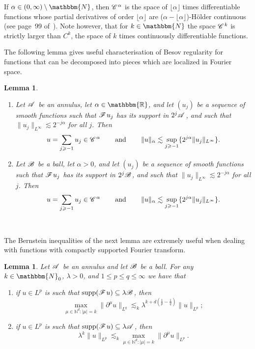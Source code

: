 \documentclass[11pt,reqno]{amsart}
\newcommand{\tmdummy}{$\mbox{}$}
\newcommand{\tmop}[1]{\ensuremath{\operatorname{#1}}}
\newenvironment{enumeratenumeric}{\begin{enumerate}[1.] }{\end{enumerate}}
\newtheorem{lemma}[theorem]{Lemma}
\newcommand{\CC}{\mathscr{C} \hspace{.1em}}
\newcommand{\CF}{\mathscr{F} \hspace{.1em}}
\newcommand{\CB}{\mathscr{B} \hspace{.1em}}
\newcommand{\CA}{\mathscr{A} \hspace{.1em}}
\begin{document}
If $\alpha \in (0, \infty) \setminus \mathbbm{N}$, then $\CC^{\alpha}$ is the
space of $\lfloor \alpha \rfloor$ times differentiable functions whose partial
derivatives of order $\lfloor \alpha \rfloor$ are ($\alpha - \lfloor \alpha
\rfloor$)-H{\"o}lder continuous (see page~99
of~{\cite{bahouri_fourier_2011}}). Note however, that for $k \in \mathbbm{N}$
the space $\CC^k$ is strictly larger than $C^k$, the space of $k$ times
continuously differentiable functions.

The following lemma gives useful characterisation of Besov regularity for
functions that can be decomposed into pieces which are localized in Fourier
space.

\begin{lemma}
  \label{lem: Besov regularity of series}{\tmdummy}
  
  \begin{enumeratenumeric}
    \item Let $\CA$ be an annulus, let $\alpha \in \mathbb{\mathbbm{R}}$, and
    let $(u_j)$ be a sequence of smooth functions such that $\CF u_j$ has its
    support in $2^j \CA$, and such that $\|u_j \|_{L^{\infty}} \lesssim 2^{- j
    \alpha}$ for all $j$. Then
    \[ u = \sum_{j \geqslant - 1} u_j \in \CC^{\alpha} \qquad \tmop{and}
       \qquad \|u\|_{\alpha} \lesssim \sup_{j \geqslant - 1} \{2^{j \alpha}
       \|u_j \|_{L^{\infty}} \} . \]
    \item Let $\CB$ be a ball, let $\alpha > 0$, and let $(u_j)$ be a sequence
    of smooth functions such that $\CF u_j$ has its support in $2^j \CB$, and
    such that $\|u_j \|_{L^{\infty}} \lesssim 2^{- j \alpha}$ for all $j$.
    Then
    \[ u = \sum_{j \geqslant - 1} u_j \in \CC^{\alpha} \qquad \tmop{and}
       \qquad \|u\|_{\alpha} \lesssim \sup_{j \geqslant - 1} \{2^{j \alpha}
       \|u_j \|_{L^{\infty}} \} . \]
  \end{enumeratenumeric}
\end{lemma}

\

The Bernstein inequalities of the next lemma are extremely useful when
dealing with functions with compactly supported Fourier transform.

\begin{lemma}
  \label{lemma:Bernstein}Let $\CA$ be an annulus and let $\CB$ be a ball. For
  any $k \in \mathbbm{N}_0$, $\lambda > 0$, and $1 \leqslant p \leqslant q
  \leqslant \infty$ we have that
  \begin{enumeratenumeric}
    \item if $u \in L^p$ is such that $\tmop{supp} (\CF u) \subseteq \lambda
    \CB$, then
    \[ \max_{\mu \in \mathbb{N}^d : | \mu | = k} \| \partial^{\mu} u\|_{L^q}
       \lesssim_k \lambda^{k + d \left( \frac{1}{p} - \frac{1}{q} \right)}
       \|u\|_{L^p} ; \]
    \item if $u \in L^p$ is such that $\tmop{supp} (\CF u) \subseteq \lambda
    \CA$, then
    \[ \lambda^k \|u\|_{L^p} \lesssim_k \max_{\mu \in \mathbb{N}^d : | \mu | =
       k} \| \partial^{\mu} u\|_{L^p} . \]
  \end{enumeratenumeric}
\end{lemma}
\end{document}
